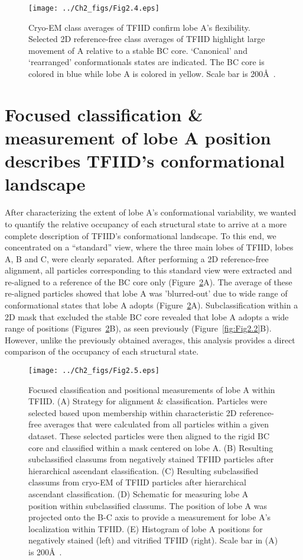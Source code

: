 \begin{figure}
\centering
\texttt{[image: ../Ch2\_figs/Fig2.4.eps]}
\caption[Cryo-EM class averages of TFIID confirm lobe A’s flexibility]{Cryo-EM class averages of TFIID confirm lobe A’s flexibility. Selected 2D reference-free class averages of TFIID highlight large movement of A relative to a stable BC core.  ‘Canonical’ and ‘rearranged’ conformationals states are indicated. The BC core is colored in blue while lobe A is colored in yellow. Scale bar is 200\AA\ .}
\label{fig:Fig2.4}
\end{figure}
\section{Focused classification \& measurement of lobe A position describes TFIID's conformational landscape}
After characterizing the extent of lobe A's conformational variability, we wanted to quantify the relative occupancy of each structural state to arrive at a more complete description of TFIID's conformational landscape. To this end, we concentrated on a “standard” view, where the three main lobes of TFIID, lobes A, B and C, were clearly separated. After performing a 2D reference-free alignment, all particles corresponding to this standard view were extracted and re-aligned to a reference of the BC core only (Figure~\ref{fig:Fig2.5}A). The average of these re-aligned particles showed that lobe A was 'blurred-out' due to wide range of conformational states that lobe A adopts (Figure~\ref{fig:Fig2.5}A). Subclassification within a 2D mask that excluded the stable BC core revealed that lobe A adopts a wide range of positions (Figures~\ref{fig:Fig2.5}B), as seen previously (Figure~\ref{fig:Fig2.2}B). However, unlike the previously obtained averages, this analysis provides a direct comparison of the occupancy of each structural state. \\
\begin{figure}
\centering
\texttt{[image: ../Ch2\_figs/Fig2.5.eps]}
\caption[Focused classification and positional measurements of lobe A within TFIID]{Focused classification and positional measurements of lobe A within TFIID. (A) Strategy for alignment \& classification.  Particles were selected based upon membership within characteristic 2D reference-free averages that were calculated from all particles within a given dataset.  These selected particles were then aligned to the rigid BC core and classified within a mask centered on lobe A.  (B) Resulting subclassified classums from negatively stained TFIID particles after hierarchical ascendant classification.  (C) Resulting subclassified classums from cryo-EM of TFIID particles after hierarchical ascendant classification.  (D) Schematic for measuring lobe A position within subclassified classums.  The position of lobe A was projected onto the B-C axis to provide a measurement for lobe A’s localization within TFIID. (E) Histogram of lobe A positions for negatively stained (left) and vitrified TFIID (right).  Scale bar in (A) is 200\AA\ .}
\label{fig:Fig2.5}
\end{figure}
